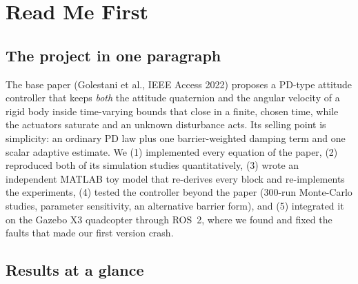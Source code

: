 \section{Read Me First}
\label{sec:readme}

\subsection{The project in one paragraph}

The base paper (Golestani et al., IEEE Access 2022) proposes a PD-type attitude controller that keeps \emph{both} the
attitude quaternion and the angular velocity of a rigid body inside time-varying bounds that close in a finite, chosen
time, while the actuators saturate and an unknown disturbance acts. Its selling point is simplicity: an ordinary PD law
plus one barrier-weighted damping term and one scalar adaptive estimate. We (1) implemented every equation of the
paper, (2) reproduced both of its simulation studies quantitatively, (3) wrote an independent MATLAB toy model that
re-derives every block and re-implements the experiments, (4) tested the controller beyond the paper (300-run Monte-Carlo studies, parameter
sensitivity, an alternative barrier form), and (5) integrated it on the Gazebo X3 quadcopter through ROS~2, where we
found and fixed the faults that made our first version crash.

\subsection{Results at a glance}

